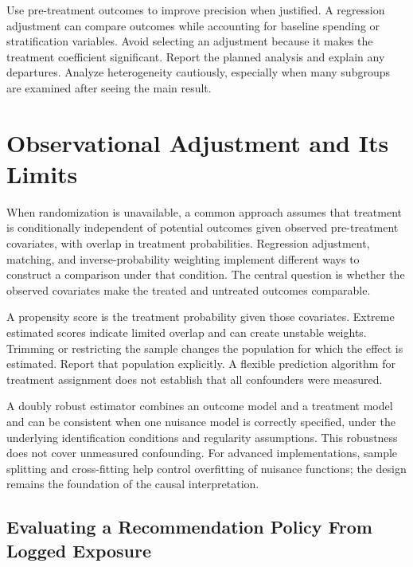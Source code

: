 Use pre-treatment outcomes to improve precision when justified. A
regression adjustment can compare outcomes while accounting for baseline
spending or stratification variables. Avoid selecting an adjustment
because it makes the treatment coefficient significant. Report the
planned analysis and explain any departures. Analyze heterogeneity
cautiously, especially when many subgroups are examined after seeing the
main result.

\hypertarget{M06-observational-adjustment-and-its-limits}{%
\section{Observational Adjustment and Its
Limits}\label{M06-observational-adjustment-and-its-limits}}

\noindent When randomization is unavailable, a common approach assumes that
treatment is conditionally independent of potential outcomes given
observed pre-treatment covariates, with overlap in treatment
probabilities. Regression adjustment, matching, and inverse-probability
weighting implement different ways to construct a comparison under that
condition. The central question is whether the observed covariates make
the treated and untreated outcomes comparable.

A propensity score is the treatment probability given those covariates.
Extreme estimated scores indicate limited overlap and can create
unstable weights. Trimming or restricting the sample changes the
population for which the effect is estimated. Report that population
explicitly. A flexible prediction algorithm for treatment assignment
does not establish that all confounders were measured.

A doubly robust estimator combines an outcome model and a treatment
model and can be consistent when one nuisance model is correctly
specified, under the underlying identification conditions and regularity
assumptions. This robustness does not cover unmeasured confounding. For
advanced implementations, sample splitting and cross-fitting help
control overfitting of nuisance functions; the design remains the
foundation of the causal interpretation.

\hypertarget{M06-evaluating-a-recommendation-policy-from-logged-exposure}{%
\subsection{Evaluating a Recommendation Policy From Logged
Exposure}\label{M06-evaluating-a-recommendation-policy-from-logged-exposure}}

